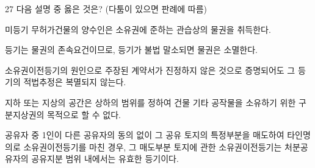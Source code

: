 \begin{question}{27}
다음 설명 중 옳은 것은? (다툼이 있으면 판례에 따름)
\begin{choices}
  \item 미등기 무허가건물의 양수인은 소유권에 준하는 관습상의 물권을 취득한다.
  \item 등기는 물권의 존속요건이므로, 등기가 불법 말소되면 물권은 소멸한다.
  \item 소유권이전등기의 원인으로 주장된 계약서가 진정하지 않은 것으로 증명되어도 그 등기의 적법추정은 복멸되지 않는다.
  \item 지하 또는 지상의 공간은 상하의 범위를 정하여 건물 기타 공작물을 소유하기 위한 구분지상권의 목적으로 할 수 없다.
  \item 공유자 중 1인이 다른 공유자의 동의 없이 그 공유 토지의 특정부분을 매도하여 타인명의로 소유권이전등기를 마친 경우, 그 매도부분 토지에 관한 소유권이전등기는 처분공유자의 공유지분 범위 내에서는 유효한 등기이다.
\end{choices}
\end{question}
